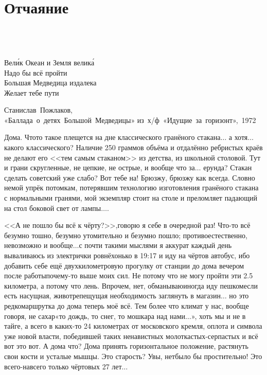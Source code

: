 \chapter{Отчаяние} 

\epigraph{%
	~\\
	~\\	
	~\\	
	Вел\'{и}к Океан и Земля велик\'{а} \\
	Надо бы всё пройти \\
	Большая Медведица издалека \\
	Желает тебе пути}
	{
	\begin{flushright}
		\small{Станислав~Пожлаков,\\«Баллада~о~детях~Большой~Медведицы» из~х/ф~«Идущие~за~горизонт»,~1972}
	\end{flushright}
	}

Дома. Что\sdash то такое плещется на дне классического гранёного стакана$\ldots$ а хотя$\ldots$ какого классического? Наличие 250 граммов объёма и отдалённо ребристых краёв не делают его <<тем самым стаканом>> из детства, из школьной столовой. Тут и грани скругленные, не цепкие, не острые, и вообще что за$\ldots$ ерунда? Стакан сделать советский уже слабо? Вот тебе на! Брюзжу, брюзжу как всегда. Словно немой упрёк потомкам, потерявшим технологию изготовления гранёного стакана с нормальными гранями, мой экземпляр стоит на столе и преломляет падающий на стол боковой свет от лампы$\ldots$.

<<А не пошло бы всё к чёрту?>>,\mdash говорю я себе в очередной раз! Что-то всё безумно тошно, безумно утомительно и безумно пошло; противоестественно, невозможно и вообще$\ldots$\mdash с почти такими мыслями я аккурат каждый день вываливаюсь из электрички ровнёхонько в 19:17 и иду на чёртов автобус, ибо добавить себе ещё двухкилометровую прогулку от станции до дома вечером после работы\mdash почему-то выше моих сил. Не потому что не могу пройти эти 2.5 километра, а потому что лень. Впрочем, нет, обманываю\mdash иногда иду пешком\mdash если есть насущная, животрепещущая необходимость заглянуть в магазин$\ldots$ но это редко\mdash маршрутка до дома теперь моё всё. Тем более что климат у нас, вообще говоря, не сахар\mdash «то дождь, то снег, то мошкара над нами$\ldots$», хоть мы и не в тайге, а всего в каких-то 24 километрах от московского кремля, оплота и символа уже новой власти, победившей таких ненавистных молоткастых-серпастых и всё вот это вот. А дома что? Дома принять горизонтальное положение, растянуть свои кости и усталые мышцы. Это старость? Увы, нет\mdash было бы простительно! Это всего-навсего только чёртовых 27 лет$\ldots$

